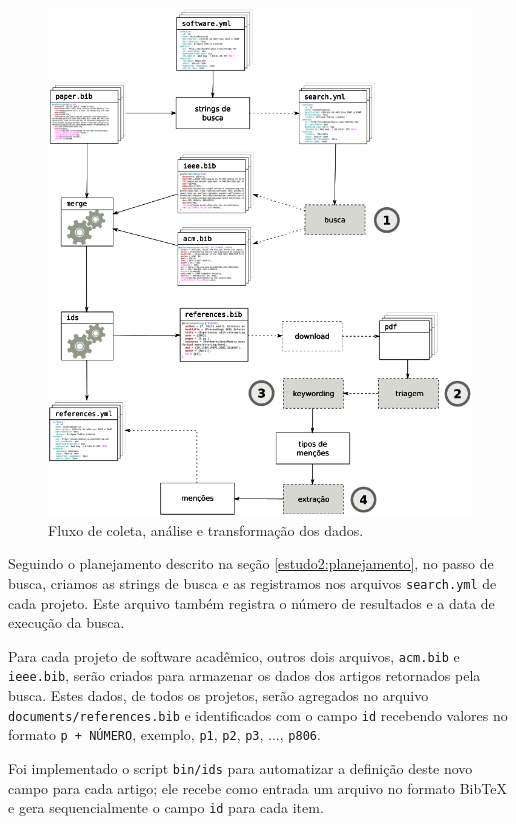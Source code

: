 \begin{figure}[h]
  \center
  \includegraphics[scale=0.35]{imagens/estudo2-fluxograma.png}
  \caption{Fluxo de coleta, análise e transformação dos dados.}
  \label{estudo2-fluxograma}
\end{figure}

Seguindo o planejamento descrito na seção \ref{estudo2:planejamento},
no passo de busca, 
criamos as strings de busca e as registramos nos arquivos \texttt{search.yml} de cada
projeto. Este arquivo também registra o número de resultados e a data de
execução da busca.

Para cada projeto de software acadêmico, outros dois arquivos,
\texttt{acm.bib} e \texttt{ieee.bib}, serão criados para armazenar os dados dos artigos
retornados pela busca. Estes dados, de todos os projetos, serão agregados no
arquivo \texttt{documents/references.bib} e identificados com
o campo \texttt{id} recebendo valores no formato \texttt{p + NÚMERO},
exemplo, \texttt{p1}, \texttt{p2}, \texttt{p3}, ..., \texttt{p806}.

Foi implementado o script \texttt{bin/ids} para automatizar a
definição deste novo campo para cada artigo; ele recebe como entrada um arquivo
no formato BibTeX e gera sequencialmente o campo \texttt{id} para cada item.

